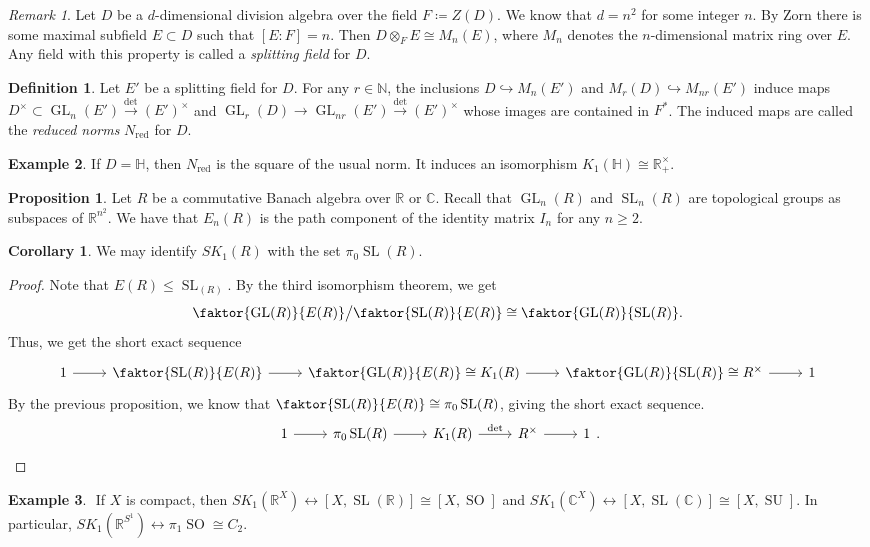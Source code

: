 \documentclass[10pt,letterpaper,cm]{nupset}
\theoremstyle{definition}
\newtheorem{definition}{Definition}
\newtheorem{exmp}[definition]{Example}
\theoremstyle{theorem}
\newtheorem{prop}[theorem]{Proposition}
\newtheorem{corollary}[theorem]{Corollary}
\theoremstyle{remark}
\newtheorem{remark}{Remark}
\newcommand{\C}{\mathbb C}
\renewcommand{\H}{\mathbb H}
\newcommand{\N}{\mathbb N}
\newcommand{\R}{\mathbb R}
\newcommand{\1}{\mathbf{1}}
\newcommand{\0}{\vec 0}
\DeclareMathOperator*{\GL}{GL}
\DeclareMathOperator*{\SL}{SL}
\DeclareMathOperator*{\SO}{SO}
\DeclareMathOperator*{\SU}{SU}
\DeclareMathOperator{\red}{red}
\begin{document}
\begin{remark}
Let $D$ be a $d$-dimensional division algebra over the field $F\coloneqq Z(D)$. We know that $d =n^2$ for some integer $n$. By Zorn there is some maximal subfield $E\subset D$ such that $[E : F] = n$. Then $D \otimes_F E \cong M_n(E)$, where $M_n$ denotes the $n$-dimensional matrix ring over $E$. Any field with this property is called a \textit{splitting field} for $D$.
\end{remark}

\begin{definition}
Let $E'$ be a splitting field for $D$. For any $r \in \N$, the inclusions $D \hookrightarrow M_n(E')$ and $M_r(D) \hookrightarrow M_{nr}(E')$ induce maps $D^{\times}\subset \GL_n(E') \overset{\det}{\longrightarrow} (E')^{\times}$ and $\GL_r(D)\to \GL_{nr}(E')  \overset{\det}{\longrightarrow} (E')^{\times}$ whose images are contained in $F^{\ast}$. The induced maps are called the \textit{reduced norms} $N_{\red}$ for $D$.
\end{definition}

\begin{exmp}
If $D = \H$, then $N_{\red}$ is the square of the usual norm. It induces an isomorphism $K_1(\H) \cong \R_+^{\times}$.
\end{exmp}

\begin{prop}
Let $R$ be a commutative Banach algebra over $\R$ or $\C$. Recall that $\GL_n(R)$ and $\SL_n(R)$ are topological groups as subspaces of $\R^{n^2}$. We have that $E_n(R)$ is the path component of the identity matrix $I_n$ for any $n\geq 2$.
\end{prop}

\begin{corollary}
We may identify $SK_1(R)$ with the set $\pi_0\SL(R)$. 
\end{corollary}
\begin{proof}
Note that $E(R)\leq \SL_(R)$. By the third isomorphism theorem, we get $$ \faktor{\GL(R)}{E(R)}\big / \faktor{\SL(R)}{E(R)} \cong \faktor{\GL(R)}{\SL(R)}.$$ Thus, we get the short exact sequence 
\[
\begin{tikzcd}
1 \arrow[r] & \faktor{\SL(R)}{E(R)} \arrow[r] & \faktor{\GL(R)}{E(R)}\cong K_1(R) \arrow[r] & \faktor{\GL(R)}{\SL(R)} \cong R^{\times} \arrow[r] & 1
\end{tikzcd}
\]
By the previous proposition, we know that $\faktor{\SL(R)}{E(R)} \cong \pi_0\SL(R)$, giving the short exact sequence.
\[
\begin{tikzcd}
1 \arrow[r] & \pi_0\SL(R) \arrow[r] & K_1(R) \arrow[r, "\det"] & R^{\times} \arrow[r] & 1
\end{tikzcd}.
\]
\end{proof}
\begin{exmp} $ $
If $X$ is compact, then $SK_1(\R^X) \leftrightarrow [X, \SL(\R)] \cong [X, \SO]$ and $SK_1(\C^X) \leftrightarrow [X, \SL(\C)] \cong [X, \SU]$.
In particular, $SK_1(\R^{S^1}) \leftrightarrow \pi_1 \SO \cong C_2$.
\end{exmp}
\end{document}
